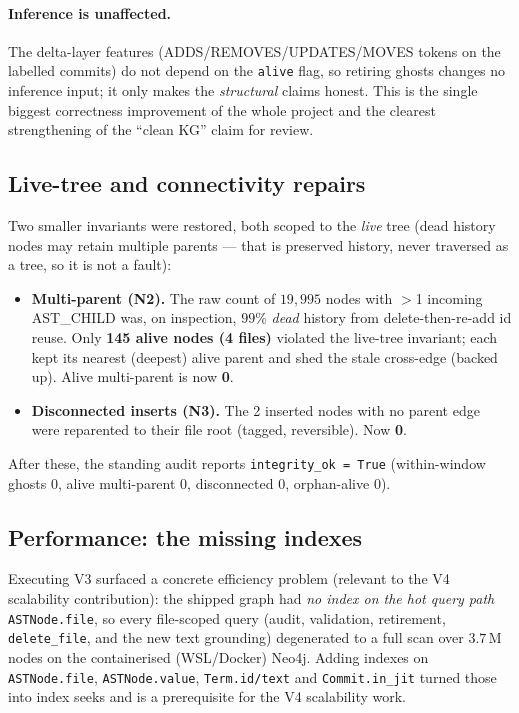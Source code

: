 \documentclass[11pt,a4paper]{article}
\newcommand{\code}[1]{\texttt{#1}}
\newcommand{\edge}[1]{\textsc{#1}}
\begin{document}
	\paragraph{Inference is unaffected.} The delta-layer features
	(\edge{ADDS}/\edge{REMOVES}/\edge{UPDATES}/\edge{MOVES} tokens on the labelled
	commits) do not depend on the \code{alive} flag, so retiring ghosts changes no
	inference input; it only makes the \emph{structural} claims honest. This is the
	single biggest correctness improvement of the whole project and the clearest
	strengthening of the ``clean KG'' claim for review.

	\subsection{Live-tree and connectivity repairs}\label{sec:v3tree}
	Two smaller invariants were restored, both scoped to the \emph{live} tree (dead
	history nodes may retain multiple parents --- that is preserved history, never
	traversed as a tree, so it is not a fault):
	\begin{itemize}[nosep]
		\item \textbf{Multi-parent (N2).} The raw count of $19{,}995$ nodes with $>$1
		incoming \edge{AST\_CHILD} was, on inspection, $99\%$ \emph{dead} history from
		delete-then-re-add id reuse. Only \textbf{145 alive nodes (4 files)} violated the
		live-tree invariant; each kept its nearest (deepest) alive parent and shed the
		stale cross-edge (backed up). Alive multi-parent is now \textbf{0}.
		\item \textbf{Disconnected inserts (N3).} The 2 inserted nodes with no parent edge
		were reparented to their file root (tagged, reversible). Now \textbf{0}.
	\end{itemize}
	After these, the standing audit reports \code{integrity\_ok = True}
	(within-window ghosts $0$, alive multi-parent $0$, disconnected $0$, orphan-alive
	$0$).

	\subsection{Performance: the missing indexes}\label{sec:v3perf}
	Executing V3 surfaced a concrete efficiency problem (relevant to the V4 scalability
	contribution): the shipped graph had \emph{no index on the hot query path}
	\code{ASTNode.file}, so every file-scoped query (audit, validation, retirement,
	\texttt{delete\_file}, and the new text grounding) degenerated to a full scan over
	$3.7$\,M nodes on the containerised (WSL/Docker) Neo4j. Adding indexes on
	\code{ASTNode.file}, \code{ASTNode.value}, \code{Term.id/text} and \code{Commit.in\_jit}
	turned those into index seeks and is a prerequisite for the V4 scalability work.
\end{document}
